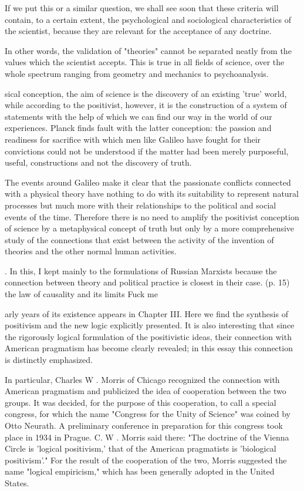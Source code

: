 If we put this or a similar question, we shall see soon that these criteria will
contain, to a certain extent, the psychological and sociological characteristics
of the scientist, because they are relevant for the acceptance of any doctrine.

In other words, the validation of "theories" cannot be separated neatly from the
values which the scientist accepts. This is true in all fields of science, over
the whole spectrum ranging from geometry and mechanics to psychoanalysis.


sical conception, the aim of science is the discovery of an existing 'true'
world, while according to the positivist, however, it is the  construction of a
system of statements with the help of which we can  find our way in the world of
our experiences. Planck finds fault with  the latter conception: the passion and
readiness for sacrifice with  which men like Galileo have fought for their
convictions could not be  understood if the matter had been merely purposeful,
useful, constructions and not the discovery of truth.

The events around Galileo make it clear that the passionate conflicts  connected
with a physical theory have nothing to do with its suitability  to represent
natural processes but much more with their relationships  to the political and
social events of the time. Therefore there is no need  to amplify the positivist
conception of science by a metaphysical  concept of truth but only by a more
comprehensive study of the  connections that exist between the activity of the
invention of theories  and the other normal human activities.


. In this, I kept mainly to the formulations of Russian Marxists because the
connection between theory and  political practice is closest in their case. (p.
15) the law of causality and its limits Fuck me

arly years of its existence appears in Chapter III. Here we find the synthesis
of positivism  and the new logic explicitly presented. It is also  interesting
that since the rigorously logical formulation of the positivistic ideas, their
connection with  American pragmatism has become clearly revealed; in  this essay
this connection is distinctly emphasized.


In particular, Charles  W . Morris of Chicago recognized the connection  with
American pragmatism and publicized the idea  of cooperation between the two
groups. It was decided, for the purpose of this cooperation, to call a  special
congress, for which the name "Congress for  the Unity of Science" was coined by
Otto Neurath.  A preliminary conference in preparation for this congress took
place in 1934 in Prague. C. W . Morris said  there: "The doctrine of the Vienna
Circle is 'logical  positivism,' that of the American pragmatists is 'biological
positivism'." For the result of the cooperation  of the two, Morris suggested
the name "logical empiricism," which has been generally adopted in the  United
States.


